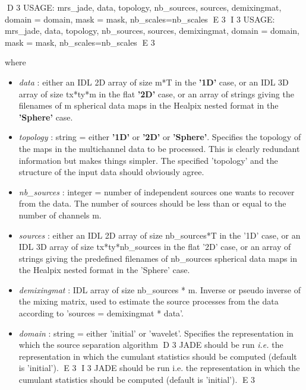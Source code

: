 {\bf
\begin{center}
D 3
     USAGE:  mrs\_jade, data, topology, nb\_sources, sources, demixingmat, domain = domain, mask = mask, nb\_scales=nb\_scales
E 3
I 3
     USAGE: mrs\_jade, data, topology, nb\_sources, sources, demixingmat, domain = domain, mask = mask, nb\_scales=nb\_scales
E 3
\end{center}}
where
\begin{itemize}
\item {\em data} : either an IDL 2D array of size m*T in the \textbf{'1D'} case, or an IDL 3D array of size tx*ty*m 
in the flat \textbf{'2D'} case, or an array of strings giving the filenames of m spherical data maps in the Healpix 
nested format in the \textbf{'Sphere'} case. 

\item {\em topology} : string = either \textbf{'1D'} or \textbf{'2D'} or \textbf{'Sphere'}. Specifies the topology 
of the maps in the multichannel data to be processed. This is clearly redundant information but makes things simpler. 
The specified 'topology' and the structure of the input data should obviously agree.

\item {\em nb\_sources} : integer = number of independent sources one wants to recover from the data. 
The number of sources should be less than or equal to the number of channels m.

\item {\em sources} : either an IDL 2D array of size nb\_sources*T in the '1D' case, or an IDL 3D array 
of size tx*ty*nb\_sources in the flat '2D' case, or an array of strings giving the predefined filenames 
of nb\_sources spherical data maps in the Healpix nested format in the 'Sphere' case. 

\item {\em demixingmat} : IDL array of size nb\_sources * m. Inverse or pseudo inverse of the mixing matrix, 
used to estimate the source processes from the data according to 'sources = demixingmat * data'.

\item {\em domain} : string = either 'initial' or 'wavelet'. Specifies the representation in which the source separation algorithm 
D 3
JADE should be run \emph{i.e.} the representation in which the cumulant statistics should be computed (default is 'initial').	
E 3
I 3
JADE should be run i.e. the representation in which the cumulant statistics should be computed (default is 'initial').	
E 3


\end{itemize}
